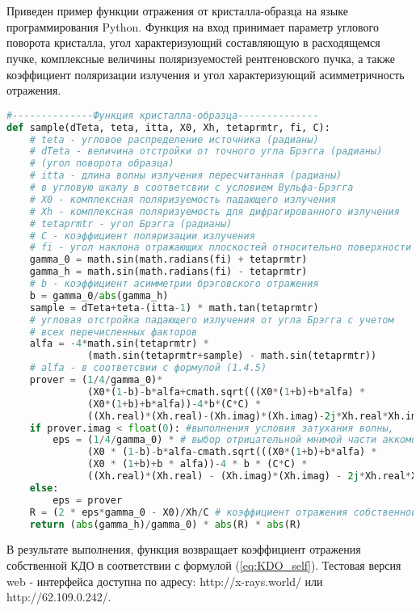 \newpage
  \section{ }%
  \label{sec:sample_functions}

Приведен пример функции отражения от кристалла-образца на
языке программирования Python. Функция на вход принимает
параметр углового поворота кристалла, угол характеризующий
составляющую в расходящемся пучке, комплексные величины поляризуемостей
 рентгеновского пучка, а также коэффициент поляризации излучения и угол
 характеризующий асимметричность отражения.

{\scriptsize
\begin{lstlisting}[language=Python]
#--------------Функция кристалла-образца--------------
def sample(dTeta, teta, itta, X0, Xh, tetaprmtr, fi, C):
    # teta - угловое распределение источника (радианы)
    # dTeta - величина отстройки от точного угла Брэгга (радианы)
    # (угол поворота образца)
    # itta - длина волны излучения пересчитанная (радианы)
    # в угловую шкалу в соответсвии с условием Вульфа-Брэгга
    # X0 - комплексная поляризуемость падающего излучения
    # Xh - комплексная поляризуемость для дифрагированного излучения
    # tetaprmtr - угол Брэгга (радианы)
    # C - коэффициент поляризации излучения
    # fi - угол наклона отражающих плоскостей относительно поверхности (градусы)
    gamma_0 = math.sin(math.radians(fi) + tetaprmtr)
    gamma_h = math.sin(math.radians(fi) - tetaprmtr)
    # b - коэффициент асимметрии брэговского отражения
    b = gamma_0/abs(gamma_h)
    sample = dTeta+teta-(itta-1) * math.tan(tetaprmtr)
    # угловая отстройка падающего излучения от угла Брэгга с учетом
    # всех перечисленных факторов
    alfa = -4*math.sin(tetaprmtr) *
              (math.sin(tetaprmtr+sample) - math.sin(tetaprmtr))
    # alfa - в соответсвии с формулой (1.4.5)
    prover = (1/4/gamma_0)*
              (X0*(1-b)-b*alfa+cmath.sqrt(((X0*(1+b)+b*alfa) *
              (X0*(1+b)+b*alfa))-4*b*(C*C) *
              ((Xh.real)*(Xh.real)-(Xh.imag)*(Xh.imag)-2j*Xh.real*Xh.imag)))
    if prover.imag < float(0): #выполнения условия затухания волны,
        eps = (1/4/gamma_0) * # выбор отрицательной мнимой части аккомодации
              (X0 * (1-b)-b*alfa-cmath.sqrt(((X0*(1+b)+b*alfa) *
              (X0 * (1+b)+b * alfa))-4 * b * (C*C) *
              ((Xh.real)*(Xh.real) - (Xh.imag)*(Xh.imag) - 2j*Xh.real*Xh.imag)))
    else:
        eps = prover
    R = (2 * eps*gamma_0 - X0)/Xh/C # коэффициент отражения собственной КДО
    return (abs(gamma_h)/gamma_0) * abs(R) * abs(R)
\end{lstlisting}
}
В результате выполнения, функция возвращает коэффициент отражения собственной КДО в
соответствии с формулой (\ref{eq:KDO_self}). Тестовая версия web - интерфейса
доступна по адресу: http://x-rays.world/ или http://62.109.0.242/.
